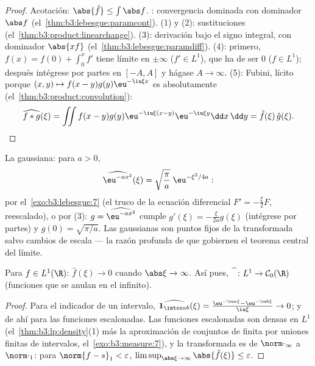 \begin{proof}
Acotación: $\abs{\hat f} \leq \int\abs f$.
: convergencia dominada
con dominador $\abs f$ (el~\cref{thm:b3:lebesgue:paramcont}). (1) y (2):
sustituciones (el~\cref{thm:b3:product:linearchange}). (3): derivación
bajo el signo integral, con dominador $\abs{xf}$
(el~\cref{thm:b3:lebesgue:paramdiff}). (4): primero, $f(x) = f(0)
+ \int_0^xf'$ tiene límite en $\pm\infty$ ($f' \in L^1$), que ha de ser
$0$ ($f \in L^1$); después intégrese por partes en $[-A,
A]$ y hágase $A \to \infty$. (5): Fubini, lícito porque
$(x,y)\mapsto f(x - y)g(y)\eu^{-\iu\xi x}$ es absolutamente
(el~\cref{thm:b3:product:convolution}):
\[
\widehat{f*g}(\xi) = \iint f(x - y)g(y)\eu^{-\iu\xi(x - y)}
\eu^{-\iu\xi y}\dd x\,\dd y = \hat f(\xi)\,\hat g(\xi).
\]
\end{proof}

\begin{example}\label{ex:b3:fouriertransform:gaussian}
La gaussiana: para $a > 0$,
\[
\widehat{\eu^{-ax^2}}(\xi) =
\sqrt{\frac\pi a}\;\eu^{-\xi^2/4a} :
\]
por el~\cref{exo:b3:lebesgue:7} (el truco de la ecuación diferencial
$F' = -\frac\xi{2}F$, reescalado), o por (3):
$g = \widehat{\eu^{-ax^2}}$ cumple $g'(\xi) = -\frac{\xi}{2a}g(\xi)$
(intégrese por partes) y $g(0) = \sqrt{\pi/a}$. Las gaussianas son
puntos fijos de la transformada salvo cambios de escala --- la razón
profunda de que gobiernen el teorema central del límite.
\end{example}

\begin{theorem}
\label{thm:b3:fouriertransform:riemannlebesgue}
Para $f \in L^1(\R)$: $\hat f(\xi) \to 0$ cuando $\abs\xi \to
\infty$. Así pues, $\widehat{\phantom f} \colon L^1 \to \mathcal
C_0(\R)$ (funciones  que
se anulan en el infinito).
\end{theorem}

\begin{proof}
Para el indicador de un intervalo, $\widehat{\mathbf 1_{\intcc
ab}}(\xi) = \frac{\eu^{-\iu a\xi} - \eu^{-\iu b\xi}}{\iu\xi}
\to 0$; y de ahí para las funciones escalonadas. Las funciones
escalonadas son densas en $L^1$ (el~\cref{thm:b3:lp:density}(1) más la
aproximación de conjuntos de 
finita por uniones finitas de intervalos, el~\cref{exo:b3:measure:7}),
y la transformada es  de
$\norm\cdot_\infty$ a $\norm\cdot_1$: para $\norm{f -
s}_1 < \varepsilon$, $\limsup_{\abs\xi\to\infty}\abs{\hat
f(\xi)} \leq \varepsilon$.
\end{proof}

